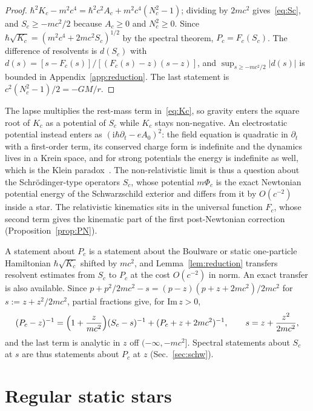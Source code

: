 \documentclass[%
 aip,
 jmp,
 amsmath,amssymb,
 reprint, onecolumn
]{revtex4-1}
\theoremstyle{definition}
\theoremstyle{remark}
\newcommand{\rmi}{\mathrm{i}}
\begin{document}
\begin{proof}
$\hbar^2K_c-m^2c^4=\hbar^2c^2A_c+m^2c^4(N_c^2-1)$; dividing by $2mc^2$
gives~\eqref{eq:Sc}, and $S_c\geq-mc^2/2$ because $A_c\geq0$ and
$N_c^2\geq0$. Since $\hbar\sqrt{K_c}=(m^2c^4+2mc^2S_c)^{1/2}$ by the
spectral theorem, $P_c=F_c(S_c)$. The difference of resolvents is
$d(S_c)$ with $d(s)=[s-F_c(s)]/[(F_c(s)-z)(s-z)]$, and
$\sup_{s\geq-mc^2/2}|d(s)|$ is bounded in Appendix~\ref{app:reduction}.
The last statement is $c^2(N_c^2-1)/2=-GM/r$.
\end{proof}

The lapse multiplies the rest-mass term in~\eqref{eq:Kc}, so gravity
enters the square root of $K_c$ as a potential of $S_c$ while $K_c$
stays non-negative. An electrostatic potential instead enters as
$(\rmi\hbar\partial_t-eA_0)^2$: the field equation is quadratic in
$\partial_t$ with a first-order term, its conserved charge form is
indefinite and the dynamics lives in a Krein space, and for strong
potentials the energy is indefinite as well, which is the Klein
paradox~\cite{Veselic1971,Veselic1983}. The non-relativistic limit is thus
a question about the Schr\"odinger-type operators $S_c$, whose potential
$m\Phi_c$ is the exact Newtonian potential energy of the Schwarzschild
exterior and differs from it by $O(c^{-2})$ inside a star. The relativistic
kinematics sits in the universal function $F_c$, whose second term gives
the kinematic part of the first post-Newtonian correction
(Proposition~\ref{prop:PN}).

A statement about $P_c$ is a statement about the Boulware or static
one-particle Hamiltonian $\hbar\sqrt{K_c}$ shifted by $mc^2$, and
Lemma~\ref{lem:reduction} transfers resolvent estimates from $S_c$ to
$P_c$ at the cost $O(c^{-2})$ in norm. An exact transfer is also
available. Since $p+p^2/2mc^2-s=(p-z)(p+z+2mc^2)/2mc^2$ for
$s:=z+z^2/2mc^2$, partial fractions give, for $\mathrm{Im}\,z>0$,
\begin{equation}\label{eq:P-S-resolvent}
(P_c-z)^{-1}=\Bigl(1+\frac{z}{mc^2}\Bigr)(S_c-s)^{-1}+(P_c+z+2mc^2)^{-1},
\qquad s=z+\frac{z^2}{2mc^2},
\end{equation}
and the last term is analytic in $z$ off $(-\infty,-mc^2]$. Spectral
statements about $S_c$ at $s$ are thus statements about $P_c$ at $z$
(Sec.~\ref{sec:schw}).

\section{Regular static stars}\label{sec:stars}
\end{document}
